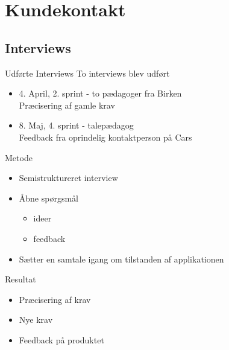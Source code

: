 \section{Kundekontakt}

\subsection{Interviews}

\begin{frame}{Udførte Interviews}
To interviews blev udført 

\begin{itemize}
\item 4. April, 2. sprint - to pædagoger fra Birken \\ Præcisering af gamle krav
\item 8. Maj, 4. sprint - talepædagog \\Feedback fra oprindelig kontaktperson på Cars 
\end{itemize}

\end{frame}

\begin{frame}{Metode}
\begin{itemize}
\item Semistruktureret interview 
\item Åbne spørgsmål 
\begin{itemize}
\item ideer
\item feedback
\end{itemize}
\item Sætter en samtale igang om tilstanden af applikationen
\end{itemize}
\end{frame}

\begin{frame}{Resultat}
\begin{itemize}
\item Præcisering af krav
\item Nye krav
\item Feedback på produktet
\end{itemize}
\end{frame}

